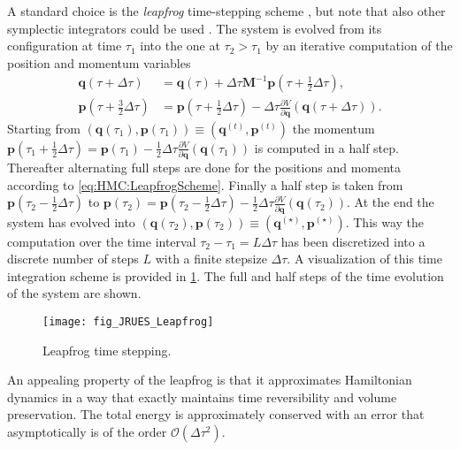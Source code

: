 A standard choice is the \textit{leapfrog} time-stepping scheme \cite{Physics:Hairer2003}, but note that also other symplectic integrators could be used \cite{MCMC:Blanes2014}.
The system is evolved from its configuration at time \(\tau_1\) into the one at \(\tau_2 > \tau_1\) by an iterative computation of the position and momentum variables
\begin{subequations} \label{eq:HMC:LeapfrogScheme}
  \begin{align}
    \bm{q}(\tau + \Delta\tau) &= \bm{q}(\tau) + \Delta\tau \bm{M}^{-1} \bm{p} (\tau + \frac{1}{2} \Delta\tau), \label{eq:HMC:LeapfrogScheme:q} \\
    \bm{p}(\tau + \frac{3}{2} \Delta\tau) &= \bm{p}(\tau + \frac{1}{2} \Delta\tau) - \Delta\tau \frac{\partial V}{\partial \bm{q}} (\bm{q}(\tau + \Delta\tau)) \label{eq:HMC:LeapfrogScheme:p}.
  \end{align}
\end{subequations}
Starting from \((\bm{q}(\tau_1),\bm{p}(\tau_1)) \equiv (\bm{q}^{(t)},\bm{p}^{(t)})\) the momentum
\(\bm{p}(\tau_1 + \frac{1}{2} \Delta\tau) = \bm{p}(\tau_1) - \frac{1}{2} \Delta\tau \frac{\partial V}{\partial \bm{q}} (\bm{q}(\tau_1))\) is computed in a half step.
Thereafter alternating full steps are done for the positions and momenta according to \cref{eq:HMC:LeapfrogScheme}.
Finally a half step is taken from \(\bm{p}(\tau_2 - \frac{1}{2} \Delta\tau)\) to
\(\bm{p}(\tau_2) = \bm{p}(\tau_2 - \frac{1}{2} \Delta\tau) - \frac{1}{2} \Delta\tau \frac{\partial V}{\partial \bm{q}} (\bm{q}(\tau_2))\).
At the end the system has evolved into \((\bm{q}(\tau_2),\bm{p}(\tau_2)) \equiv (\bm{q}^{(\star)},\bm{p}^{(\star)})\).
This way the computation over the time interval \(\tau_2 - \tau_1 = L \Delta\tau\) has been discretized into a discrete number of steps \(L\) with a finite stepsize \(\Delta\tau\).
A visualization of this time integration scheme is provided in \cref{fig:Leapfrog}.
The full and half steps of the time evolution of the system are shown.
\begin{figure}[ht]
  \centering
  \texttt{[image: fig\_JRUES\_Leapfrog]}
  \caption[Leapfrog time stepping]{Leapfrog time stepping.}
  \label{fig:Leapfrog}
\end{figure}
\par %
An appealing property of the leapfrog is that it approximates Hamiltonian dynamics in a way that exactly maintains time reversibility and volume preservation.
The total energy is approximately conserved with an error that asymptotically is of the order \(\mathcal{O}(\Delta\tau^2)\).
